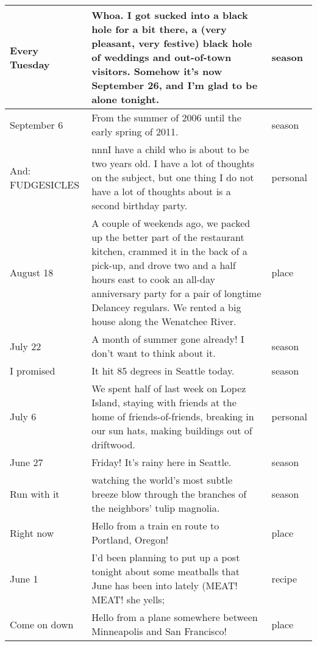 \documentclass[12pt]{article}
\begin{document}
\begin{longtable}{ | p{3.0cm} | p{12.0cm} |p{2.0cm}| }
Every Tuesday & Whoa. I got sucked into a black hole for a bit there, a (very pleasant, very festive) black hole of weddings and out-of-town visitors. Somehow it’s now September 26, and I’m glad to be alone tonight. & season \\\hline

September 6 &  From the summer of 2006 until the early spring of 2011.&  season \\\hline

And: FUDGESICLES & nnnI have a child who is about to be two years old. I have a lot of thoughts on the subject, but one thing I do not have a lot of thoughts about is a second birthday party. & personal \\\hline
August 18 & A couple of weekends ago, we packed up the better part of the restaurant kitchen, crammed it in the back of a pick-up, and drove two and a half hours east to cook an all-day anniversary party for a pair of longtime Delancey regulars. We rented a big house along the Wenatchee River. & place \\\hline

July 22& A month of summer gone already! I don’t want to think about it. &season \\\hline

 I promised&It hit 85 degrees in Seattle today. &season  \\\hline
 
 July 6& We spent half of last week on Lopez Island, staying with friends at the home of friends-of-friends, breaking in our sun hats, making buildings out of driftwood. & personal \\\hline
 
 June 27&Friday! It’s rainy here in Seattle.  &  season \\\hline 
 
Run with it & watching the world’s most subtle breeze blow through the branches of the neighbors’ tulip magnolia. & season \\\hline

Right now & Hello from a train en route to Portland, Oregon! & place  \\\hline

 June 1& I’d been planning to put up a post tonight about some meatballs that June has been into lately (MEAT! MEAT! she yells; & recipe  \\\hline
 
Come on down & Hello from a plane somewhere between Minneapolis and San Francisco! &  place \\\hline


\end{longtable}
\end{document}
